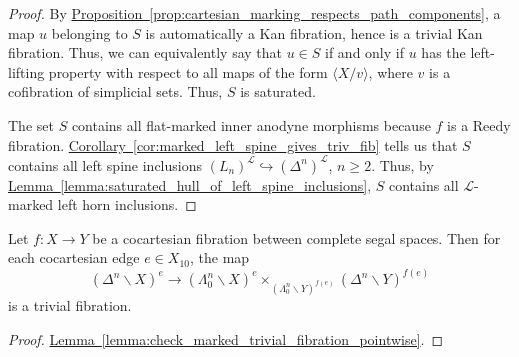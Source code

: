\documentclass[main.tex]{subfiles}
\begin{document}
\begin{proof}
  By \hyperref[prop:cartesian_marking_respects_path_components]{Proposition~\ref*{prop:cartesian_marking_respects_path_components}}, a map $u$ belonging to $S$ is automatically a Kan fibration, hence is a trivial Kan fibration. Thus, we can equivalently say that $u \in S$ if and only if $u$ has the left-lifting property with respect to all maps of the form $\langle X / v \rangle$, where $v$ is a cofibration of simplicial sets. Thus, $S$ is saturated.

  The set $S$ contains all flat-marked inner anodyne morphisms because $f$ is a Reedy fibration. \hyperref[cor:marked_left_spine_gives_triv_fib]{Corollary~\ref*{cor:marked_left_spine_gives_triv_fib}} tells us that $S$ contains all left spine inclusions $(L_{n})^{\mathcal{L}} \hookrightarrow (\Delta^{n})^{\mathcal{L}}$, $n \geq 2$. Thus, by \hyperref[lemma:saturated_hull_of_left_spine_inclusions]{Lemma~\ref*{lemma:saturated_hull_of_left_spine_inclusions}}, $S$ contains all $\mathcal{L}$-marked left horn inclusions.
\end{proof}

\begin{corollary}
  \label{cor:pointwise_left_horn_condition}
  Let $f\colon X \to Y$ be a cocartesian fibration between complete segal spaces. Then for each cocartesian edge $e \in X_{10}$, the map
  \begin{equation*}
    (\Delta^{n} \backslash X)^{e} \to (\Lambda^{n}_{0} \backslash X)^{e} \times_{(\Lambda^{n}_{0} \backslash Y)^{f(e)}} (\Delta^{n} \backslash Y)^{f(e)}
  \end{equation*}
  is a trivial fibration.
\end{corollary}
\begin{proof}
  \hyperref[lemma:check_marked_trivial_fibration_pointwise]{Lemma~\ref*{lemma:check_marked_trivial_fibration_pointwise}}.
\end{proof}
\end{document}
